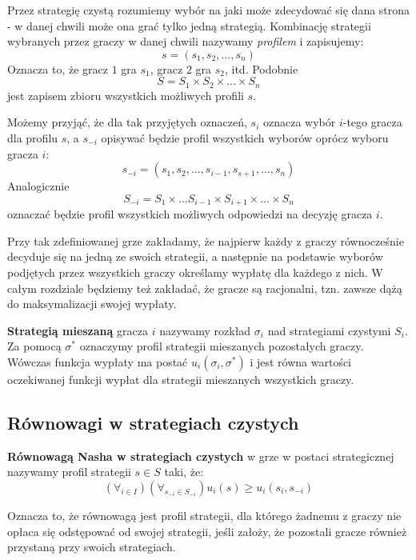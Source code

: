 \documentclass[polish]{standalone}
\begin{document}
Przez strategię czystą rozumiemy wybór na jaki może zdecydować się dana strona - w danej chwili może ona grać tylko
jedną strategią. Kombinację strategii wybranych przez graczy w danej chwili nazywamy \textit{profilem} i zapisujemy:
$$s = (s_1, s_2, ..., s_n)$$
Oznacza to, że gracz $1$ gra $s_1$, gracz $2$ gra $s_2$, itd. Podobnie
$$S = S_1 \times S_2 \times ... \times S_n$$
jest zapisem zbioru wszystkich możliwych profili $s$.

Możemy przyjąć, że dla tak przyjętych oznaczeń, $s_i$ oznacza wybór $i$-tego gracza dla profilu $s$, a $s_{-i}$ opisywać
będzie profil wszystkich wyborów oprócz wyboru gracza $i$:
$$s_{-i} = (s_1, s_2, ..., s_{i-1}, s_{s+1}, ..., s_n)$$
Analogicznie
$$S_{-i} = S_1 \times ... S_{i-1} \times S_{i+1} \times ... \times S_n$$
oznaczać będzie profil wszystkich możliwych odpowiedzi na decyzję gracza $i$.

Przy tak zdefiniowanej grze zakładamy, że najpierw każdy z graczy równocześnie decyduje się na jedną ze swoich
strategii, a następnie na podstawie wyborów podjętych przez wszystkich graczy określamy wypłatę dla każdego z nich.
W całym rozdziale będziemy też zakładać, że gracze są racjonalni, tzn. zawsze dążą do maksymalizacji swojej wypłaty.

\begin{definition}
\textbf{Strategią mieszaną} gracza $i$ nazywamy rozkład $\sigma_i$ nad strategiami czystymi
$S_i$. Za pomocą $\sigma^{*}$ oznaczymy profil strategii mieszanych pozostałych graczy. Wówczas funkcja wypłaty ma
postać $u_i(\sigma_i, \sigma^{*})$ i jest równa wartości oczekiwanej funkcji wypłat dla strategii mieszanych wszystkich
graczy.
\cite[str.~5]{FT-GT}
\end{definition}

\subsection{Równowagi w strategiach czystych}

\begin{definition}
\textbf{Równowagą Nasha w strategiach czystych} w grze w postaci strategicznej nazywamy profil
strategii $s \in S$ taki, że:
$$(\forall_{i \in I}) (\forall_{s_{-i} \in S_{-i}}) u_i(s) \geq u_i(s_i, s_{-i})$$
\cite[str.~11]{FT-GT}
\end{definition}

Oznacza to, że równowagą jest profil strategii, dla którego żadnemu z graczy nie opłaca się odstępować od swojej strategii, jeśli założy, że pozostali gracze również przystaną przy swoich strategiach.
\end{document}
